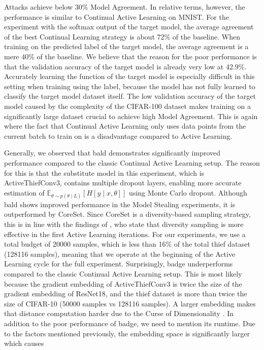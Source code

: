 Attacks achieve below 30\% Model Agreement. In relative terms, however, the performance is similar to Continual Active Learning on MNIST. For the
experiment with the softmax output of the target model, the average agreement of the best Continual Learning strategy is about 72\% of the baseline. When training
on the predicted label of the target model, the average agreement is a mere 40\% of the baseline. We believe that the reason for the poor performance is that the
validation accuracy of the target model is already very low at 42.9\%. Accurately learning the function of the target model is especially difficult in this setting
when training using the label, because the model has not fully learned to classify the target model dataset itself. The low validation accuracy of the target model
caused by the complexity of the CIFAR-100 dataset makes training on a significantly large dataset crucial to achieve high Model Agreement. This is again
where the fact that Continual Active Learning only uses data points from the current batch to train on is a disadvantage compared to Active Learning. \par
Generally, we observed that \gls{bald} demonstrates significantly improved performance compared to the classic Continual Active Learning setup. The reason for this
is that the substitute model in this experiment, which is ActiveThiefConv3, contains multiple dropout layers, enabling more accurate estimation of 
$\mathbb{E}_{\theta \sim p(\theta \mid L)} [H[y \mid x, \theta]]$ using Monte Carlo dropout. Although \gls{bald} shows improved performance in the Model Stealing
experiments, it is outperformed by CoreSet. Since CoreSet is a diversity-based sampling strategy, this is in line with the findings of \cite{ash2019deep}, who
state that diversity sampling is more effective in the first Active Learning iterations. For our experiments, we use a total budget of 20000 samples, which is less
than 16\% of the total thief dataset (128116 samples), meaning that we operate at the beginning of the Active Learning cycle for the full experiment. Surprisingly,
\gls{badge} underperforms compared to the classic Continual Active Learning setup. This is most likely because the gradient embedding of
ActiveThiefConv3 is twice the size of the gradient embedding of ResNet18, and the thief dataset is more than twice the size of CIFAR-10 (50000 samples vs 128116
samples). A larger embedding makes that distance computation harder due to the Curse of Dimensionality \cite{koppen2000curse}. In addition to the poor
performance of \gls{badge}, we need to mention its runtime. Due to the factors mentioned previously, the embedding space is significantly larger which causes
